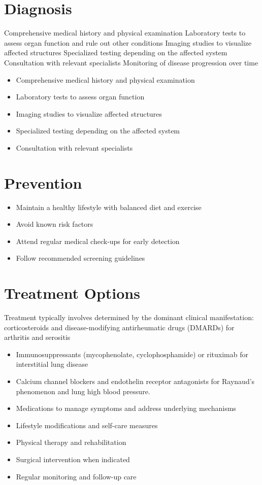 \section{Diagnosis}
Comprehensive medical history and physical examination Laboratory tests to assess organ function and rule out other conditions Imaging studies to visualize affected structures Specialized testing depending on the affected system Consultation with relevant specialists Monitoring of disease progression over time

\begin{itemize}[noitemsep]
  \item Comprehensive medical history and physical examination
  \item Laboratory tests to assess organ function
  \item Imaging studies to visualize affected structures
  \item Specialized testing depending on the affected system
  \item Consultation with relevant specialists
\end{itemize}
\section{Prevention}
\begin{itemize}[noitemsep]
  \item Maintain a healthy lifestyle with balanced diet and exercise
  \item Avoid known risk factors
  \item Attend regular medical check-ups for early detection
  \item Follow recommended screening guidelines
\end{itemize}
\section{Treatment Options}
Treatment typically involves determined by the dominant clinical manifestation: corticosteroids and disease-modifying antirheumatic drugs (DMARDs) for arthritis and serositis

\begin{itemize}[noitemsep]
  \item Immunosuppressants (mycophenolate, cyclophosphamide) or rituximab for interstitial lung disease
  \item Calcium channel blockers and endothelin receptor antagonists for Raynaud's phenomenon and lung high blood pressure.
  \item Medications to manage symptoms and address underlying mechanisms
  \item Lifestyle modifications and self-care measures
  \item Physical therapy and rehabilitation
  \item Surgical intervention when indicated
  \item Regular monitoring and follow-up care
\end{itemize}

